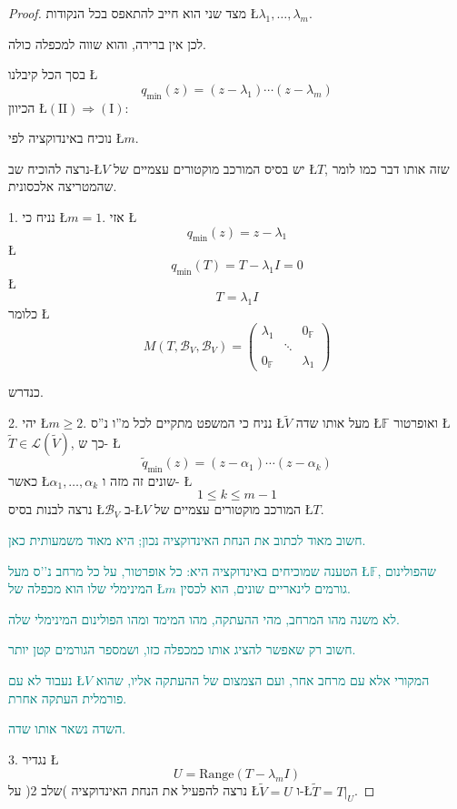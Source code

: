 \documentclass[english,hebrew]{article}
\begin{document}
\begin{proof}
מצד שני הוא חייב להתאפס בכל הנקודות \L{$\lambda_{1},\dots,\lambda_{m}$}.

לכן אין ברירה, והוא שווה למכפלה כולה.

בסך הכל קיבלנו \L{%
\[
q_{\min}(z)=(z-\lambda_{1})\cdots(z-\lambda_{m})
\]
}%
הכיוון \L{$(\text{II})\Rightarrow(\text{I})$}:

נוכיח באינדוקציה לפי \L{$m$}.

נרצה להוכיח שב-\L{$V$} יש בסיס המורכב מוקטורים עצמיים של \L{$T$},
שזה אותו דבר כמו לומר שהמטריצה אלכסונית.

1. נניח כי \L{$m=1$}. אזי \L{%
\[
q_{\min}(z)=z-\lambda_{1}
\]
}%
\L{%
\[
q_{\min}(T)=T-\lambda_{1}I=0
\]
}%
\L{%
\[
T=\lambda_{1}I
\]
}%
כלומר \L{%
\[
M(T,\mathcal{B}_{V},\mathcal{B}_{V})=\begin{pmatrix}\lambda_{1} &  & 0_{\mathbb{F}}\\
 & \ddots\\
0_{\mathbb{F}} &  & \lambda_{1}
\end{pmatrix}
\]
}%

כנדרש.

2. יהי \L{$m\geq2$}. נניח כי המשפט מתקיים לכל מ\textquotedblright ו
נ\textquotedblright ס \L{$\widetilde{V}$} מעל אותו שדה \L{$\mathbb{F}$}
ואופרטור \L{$\widetilde{T}\in\mathcal{L}(\widetilde{V})$}, כך ש-
\L{%
\[
\widetilde{q}_{\min}(z)=(z-\alpha_{1})\cdots(z-\alpha_{k})
\]
}%
כאשר \L{$\alpha_{1},\dots,\alpha_{k}$} שונים זה מזה ו- \L{%
\[
1\leq k\leq m-1
\]
}%
נרצה לבנות בסיס \L{$\mathcal{B}_{V}$} ב-\L{$V$} המורכב מוקטורים
עצמיים של \L{$T$}.

\textcolor{teal}{חשוב מאוד לכתוב את הנחת האינדוקציה נכון; היא מאוד
משמעותית כאן.}

\textcolor{teal}{הטענה שמוכיחים באינדוקציה היא: כל אופרטור, על כל
מרחב נ'’ס מעל \L{$\mathbb{F}$}, שהפולינום המינימלי שלו הוא מכפלה
של \L{$m$} גורמים לינאריים שונים, הוא לכסין.}

\textcolor{teal}{לא משנה מהו המרחב, מהי ההעתקה, מהו המימד ומהו הפולינום
המינימלי שלה.}

\textcolor{teal}{חשוב רק שאפשר להציג אותו כמכפלה כזו, ושמספר הגורמים
קטן יותר.}

\textcolor{teal}{נעבוד לא עם \L{$V$} המקורי אלא עם מרחב אחר, ועם
הצמצום של ההעתקה אליו, שהוא פורמלית העתקה אחרת.}

\textcolor{teal}{השדה נשאר אותו שדה.}

3. נגדיר \L{%
\[
U=\text{Range}(T-\lambda_{m}I)
\]
}%
נרצה להפעיל את הנחת האינדוקציה )שלב 2( על \L{$\widetilde{V}=U$} ו-\L{$\widetilde{T}=T|_{U}$}. 


\end{proof}
\end{document}
